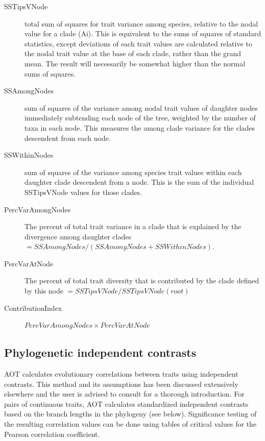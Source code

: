 \documentclass[12pt,letterpaper]{article}
\begin{document}
\begin{description}
\item[\hspace{1em} SSTipsVNode] total sum of squares for trait variance among
  species, relative to the nodal value for a clade (Ai). This is
  equivalent to the sums of squares of standard statistics, except
  deviations of each trait values are calculated relative to the nodal
  trait value at the base of each clade, rather than the grand
  mean. The result will necessarily be somewhat higher than the normal
  sums of squares.
\item[\hspace{1em} SSAmongNodes] sum of squares of the variance among nodal trait
  values of daughter nodes immediately subtending each node of the
  tree, weighted by the number of taxa in each node. This measures the
  among clade variance for the clades descendent from each node.
\item[\hspace{1em} SSWithinNodes] sum of squares of the variance among species
  trait values within each daughter clade descendent from a node. This
  is the sum of the individual SSTipsVNode values for those clades.
\item[\hspace{1em} PercVarAmongNodes] The percent of total trait variance in a
  clade that is explained by the divergence among daughter clades $=
  SSAmongNodes / (SSAmongNodes + SSWithinNodes)$.
\item[\hspace{1em} PercVarAtNode] The percent of total trait diversity that is
  contributed by the clade defined by this node $=
  SSTipsVNode / SSTipsVNode(root)$ 
\item[\hspace{1em} ContributionIndex] $PercVarAmongNodes \times PercVarAtNode$
\end{description}

\subsection{Phylogenetic independent contrasts}

AOT calculates evolutionary correlations between traits using
independent contrasts. This method and its assumptions has been
discussed extensively elsewhere and the user is advised to consult
\citet{felsenstein1985phy, garland1992pro} for a thorough
introduction. For pairs of continuous traits, AOT calculates
standardized independent contrasts based on the branch lengths in the
phylogeny (see below). Significance testing of the resulting
correlation values can be done using tables of critical values for the
Pearson correlation coefficient.
\end{document}

